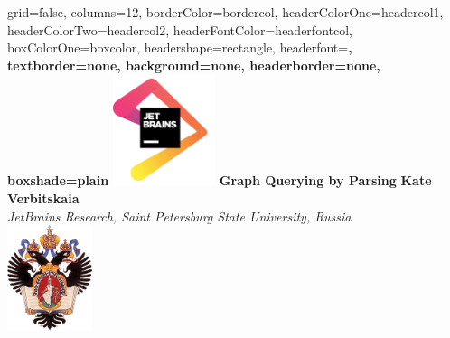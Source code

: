 \documentclass[a0paper,portrait]{baposter}
\begin{document}
\setlength{\fboxsep}{0pt}


\begin{poster}{
grid=false,
columns=12, %
borderColor=bordercol, %
headerColorOne=headercol1, %
headerColorTwo=headercol2, %
headerFontColor=headerfontcol, %
boxColorOne=boxcolor, %
headershape=rectangle, %
headerfont=\Large\sf\bf, %
textborder=none,
background=none,
headerborder=none, %
boxshade=plain
}
{\includegraphics[width=3cm]{jetbrains.png}}
%
%
{\bf \huge{Graph Querying by Parsing} }
{\vspace{0.6em} \smaller \textbf{Kate Verbitskaia} \\  %
\smaller \it {JetBrains Research, Saint Petersburg State University, Russia } \\ %
}
{\includegraphics[width=2.5cm]{SPbGU_Logo.png}} %



\end{poster}
\end{document}
